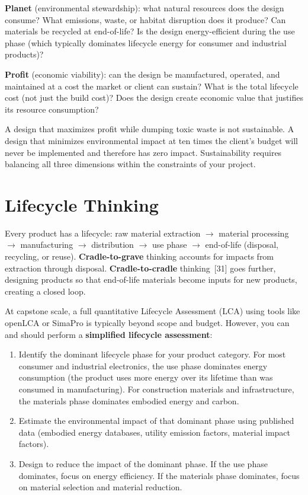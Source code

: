 \textbf{Planet} (environmental stewardship): what natural resources does the design consume? What emissions, waste, or habitat disruption does it produce? Can materials be recycled at end-of-life? Is the design energy-efficient during the use phase (which typically dominates lifecycle energy for consumer and industrial products)?

\textbf{Profit} (economic viability): can the design be manufactured, operated, and maintained at a cost the market or client can sustain? What is the total lifecycle cost (not just the build cost)? Does the design create economic value that justifies its resource consumption?

A design that maximizes profit while dumping toxic waste is not sustainable. A design that minimizes environmental impact at ten times the client's budget will never be implemented and therefore has zero impact. Sustainability requires balancing all three dimensions within the constraints of your project.

\section{Lifecycle Thinking}
Every product has a lifecycle: raw material extraction $\to$ material processing $\to$ manufacturing $\to$ distribution $\to$ use phase $\to$ end-of-life (disposal, recycling, or reuse). \textbf{Cradle-to-grave} thinking accounts for impacts from extraction through disposal. \textbf{Cradle-to-cradle} thinking~[31] goes further, designing products so that end-of-life materials become inputs for new products, creating a closed loop.

At capstone scale, a full quantitative Lifecycle Assessment (LCA) using tools like openLCA or SimaPro is typically beyond scope and budget. However, you can and should perform a \textbf{simplified lifecycle assessment}:

\begin{enumerate}[nosep,leftmargin=1.5em]
\item Identify the dominant lifecycle phase for your product category. For most consumer and industrial electronics, the use phase dominates energy consumption (the product uses more energy over its lifetime than was consumed in manufacturing). For construction materials and infrastructure, the materials phase dominates embodied energy and carbon.
\item Estimate the environmental impact of that dominant phase using published data (embodied energy databases, utility emission factors, material impact factors).
\item Design to reduce the impact of the dominant phase. If the use phase dominates, focus on energy efficiency. If the materials phase dominates, focus on material selection and material reduction.
\end{enumerate}

